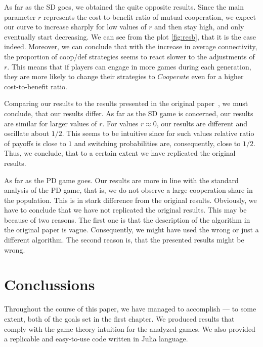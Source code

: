 \documentclass[english, twoside, 12pt, a4paper]{article}
\theoremstyle{definition}
\theoremstyle{plain}
\theoremstyle{remark}
\begin{document}

As far as the SD goes, we obtained the quite opposite results. Since the main parameter $r$ represents the cost-to-benefit ratio of mutual cooperation, we expect our curve to increase sharply for low values of \(r\) and then stay high, and only eventually start decreasing. We can see from the plot \ref{fig:resb}, that it is the case indeed. Moreover, we can conclude that with the increase in average connectivity, the proportion of coop/def strategies seems to react slower to the adjustments of $r$. This means that if players can engage in more games during each generation, they are more likely to change their strategies to $Cooperate$ even for a higher cost-to-benefit ratio. 


Comparing our results to the results presented in the original paper~\cite{santos2005scale}, we must conclude, that our results differ. As far as the SD game is concerned, our results are similar for larger values of \(r\). For values \(r\approx 0\), our results are different and oscillate about \(1/2\). This seems to be intuitive since for such values relative ratio of payoffs is close to \(1\) and switching probabilities are, consequently,  close to \(1/2\). Thus, we conclude, that to a certain extent we have replicated the original results. 

As far as the PD game goes. Our results are more in line with the standard analysis of the PD game, that is, we do not observe a large cooperation share in the population. This is in stark difference from the original results. Obviously, we have to conclude that we have not replicated the original results. This may be because of two reasons. The first one is that the description of the algorithm in the original paper is vague. Consequently, we might have used the wrong or just a different algorithm. The second reason is, that the presented results might be wrong. 

\clearpage
\section{Conclussions}


Throughout the course of this paper, we have managed to accomplish --- to some extent, both of the goals set in the first chapter. We produced results that comply with the game theory intuition for the analyzed games. We also provided a replicable and easy-to-use code written in Julia language. 
\end{document}
